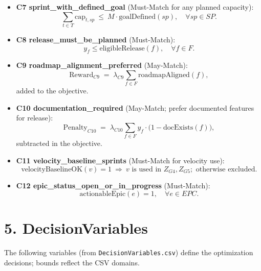 \documentclass[11pt,a4paper]{article}
\begin{document}
\begin{itemize}[leftmargin=2em,label=\(\triangleright\)]
  \item \textbf{C7 sprint\_with\_defined\_goal} (Must-Match for any planned capacity):
  \[
  \sum_{t \in T} \text{cap}_{t,sp} \ \le\ M \cdot \text{goalDefined}(sp),\quad \forall sp \in SP.
  \]

  \item \textbf{C8 release\_must\_be\_planned} (Must-Match):
  \[
  y_f \le \text{eligibleRelease}(f),\quad \forall f \in F.
  \]

  \item \textbf{C9 roadmap\_alignment\_preferred} (May-Match):
  \[
  \text{Reward}_{C9} \;=\; \lambda_{C9}\!\!\sum_{f \in F}\! \text{roadmapAligned}(f),
  \]
  added to the objective.

  \item \textbf{C10 documentation\_required} (May-Match; prefer documented features for release):
  \[
  \text{Penalty}_{C10} \;=\; \lambda_{C10}\!\!\sum_{f \in F}\! y_f \cdot \big(1-\text{docExists}(f)\big),
  \]
  subtracted in the objective.

  \item \textbf{C11 velocity\_baseline\_sprints} (Must-Match for velocity use):
  \[
  \text{velocityBaselineOK}(v)=1 \ \Rightarrow\  v \text{ is used in } Z_{G4}, Z_{G5}; \text{ otherwise excluded}.
  \]

  \item \textbf{C12 epic\_status\_open\_or\_in\_progress} (Must-Match):
  \[
  \text{actionableEpic}(e)=1,\quad \forall e \in EPC.
  \]
\end{itemize}

\section{5. DecisionVariables}
The following variables (from \texttt{DecisionVariables.csv}) define the optimization decisions; bounds reflect the CSV domains.
\end{document}
